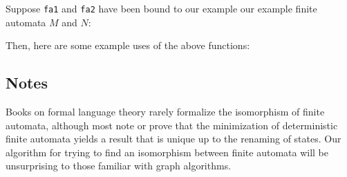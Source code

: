 Suppose \texttt{fa1} and \texttt{fa2} have been bound to our example
our example finite automata $M$ and $N$:
\begin{center}

\end{center}
Then, here are some example uses of the above functions:


\subsection{Notes}

Books on formal language theory rarely formalize the isomorphism
of finite automata, although most note or prove that the minimization of
deterministic finite automata yields a result that is unique up
to the renaming of states.  Our algorithm for trying to find an
isomorphism between finite automata will be unsurprising to those
familiar with graph algorithms.

%
%

